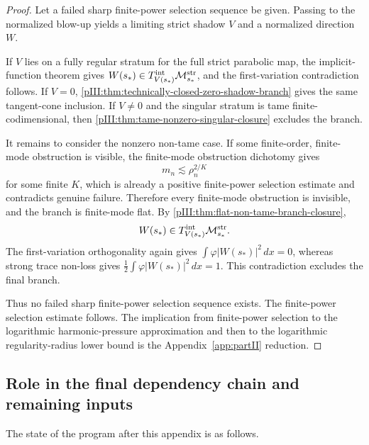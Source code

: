 \documentclass[11pt]{article}
\numberwithin{equation}{section}
\theoremstyle{plain}
\theoremstyle{definition}
\theoremstyle{remark}
\newcommand{\Mstr}{\mathcal M^{\rm str}}
\newcommand{\Tint}{T^{\rm int}}
\begin{document}
\begin{proof}
Let a failed sharp finite-power selection sequence be given.  Passing to the normalized blow-up
yields a limiting strict shadow \(V\) and a normalized direction \(W\).

If \(V\) lies on a fully regular stratum for the full strict parabolic map, the implicit-function theorem gives
\(W(s_*)\in\Tint_{V(s_*)}\Mstr_{s_*}\), and the first-variation contradiction follows.
If \(V=0\), \cref{pIII:thm:technically-closed-zero-shadow-branch} gives the same tangent-cone inclusion.
If \(V\neq0\) and the singular stratum is tame finite-codimensional, then
\cref{pIII:thm:tame-nonzero-singular-closure} excludes the branch.

It remains to consider the nonzero non-tame case.  If some finite-order, finite-mode obstruction is
visible, the finite-mode obstruction dichotomy gives
\[
        m_n\lesssim\rho_n^{2/K}
\]
for some finite \(K\), which is already a positive finite-power selection estimate and contradicts
genuine failure.  Therefore every finite-mode obstruction is invisible, and the branch is finite-mode
flat.  By \cref{pIII:thm:flat-non-tame-branch-closure},
\[
        W(s_*)\in\Tint_{V(s_*)}\Mstr_{s_*}.
\]
The first-variation orthogonality again gives \(\int\varphi|W(s_*)|^2\,dx=0\), whereas strong
trace non-loss gives \(\frac12\int\varphi|W(s_*)|^2\,dx=1\).  This contradiction excludes the
final branch.

Thus no failed sharp finite-power selection sequence exists.  The finite-power selection estimate
follows.  The implication from finite-power selection to the logarithmic harmonic-pressure
approximation and then to the logarithmic regularity-radius lower bound is the Appendix~\ref{app:partII} reduction.
\end{proof}

\subsection{Role in the final dependency chain and remaining inputs}\label{pIII:sec:status}

The state of the program after this appendix is as follows.
\end{document}
